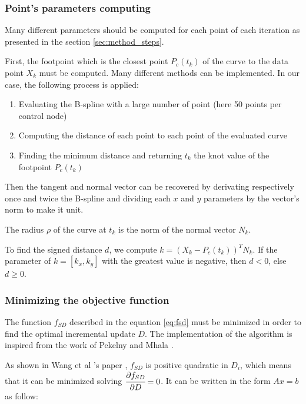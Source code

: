 \documentclass{article}
\newcommand{\vsp}{\vspace{\baselineskip}}
\begin{document}
\subsubsection{Point's parameters computing}

Many different parameters should be computed for each point of each iteration as presented in the section \ref{sec:method_steps}.

\vsp

First, the footpoint which is the closest point $P_c(t_k)$ of the curve to the data point $X_k$ must be computed. Many different methods can be implemented. In our case, the following process is applied:

\begin{enumerate}
    \item Evaluating the B-spline with a large number of point (here 50 points per control node)
    \item Computing the distance of each point to each point of the evaluated curve 
    \item Finding the minimum distance and returning $t_k$ the knot value of the footpoint $P_c(t_k)$
\end{enumerate}

Then the tangent and normal vector can be recovered by derivating respectively once and twice the B-spline and dividing each $x$ and $y$ parameters by the vector's norm to make it unit.

\vsp

The radius $\rho$ of the curve at $t_k$ is the norm of the normal vector $N_k$. 

\vsp

To find the signed distance $d$, we compute $k=(X_k-P_c(t_k))^T N_k$. If the parameter of $k=[k_x,k_y]$ with the greatest value is negative, then $d < 0$, else $d \geq 0$. 


\subsubsection{Minimizing the objective function}

The function $f_{SD}$ described in the equation \ref{eq:fsd} must be minimized in order to find the optimal incremental update $D$. The implementation of the algorithm is inspired from the work of Pekelny \cite{pekelny_bsp} and Mhala \cite{mahla_bsp}.

\vsp

As shown in Wang et al 's paper \cite{SDM_bspline_fitting}, $f_{SD}$ is positive quadratic in $D_i$, which means that it can be minimized solving $\cfrac{\partial f_{SD}}{\partial D} = 0$. It can be written in the form $Ax=b$ as follow: 
\end{document}
